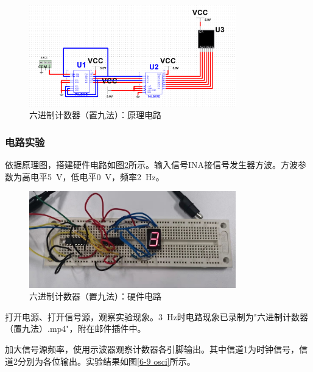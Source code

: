 \documentclass[UTF8]{ctexart}
\numberwithin{figure}{subsection}
\numberwithin{table}{subsection}
\numberwithin{equation}{subsection}
\begin{document}
\begin{figure}[H]
    \begin{center}
        \includegraphics[width=0.8\textwidth]{design/6-9 circuit.png}
    \end{center}
    \caption{六进制计数器（置九法）：原理电路}
    \label{6-9 theory cir}
\end{figure}

\subsubsection{电路实验}
\par 依据原理图，搭建硬件电路如图\ref{6-9 cir}所示。输入信号INA接信号发生器方波。方波参数为高电平\SI{5}{\volt}，低电平\SI{0}{\volt}，频率\SI{2}{\hertz}。

\begin{figure}[H]
    \begin{center}
        \includegraphics[width=0.8\textwidth]{6-9/circuit.jpg}
    \end{center}
    \caption{六进制计数器（置九法）：硬件电路}
    \label{6-9 cir}
\end{figure}

\par 打开电源、打开信号源，观察实验现象。\SI{3}{\hertz}时电路现象已录制为"六进制计数器（置九法）.mp4"，附在邮件插件中。
\par 加大信号源频率，使用示波器观察计数器各引脚输出。其中信道1为时钟信号，信道2分别为各位输出。实验结果如图\ref{6-9 osci}所示。
\end{document}
